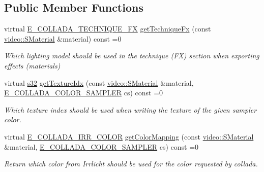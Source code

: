 \subsection*{Public Member Functions}
\begin{DoxyCompactItemize}
\item 
\mbox{\label{classirr_1_1scene_1_1IColladaMeshWriterProperties_abc0fb19092b53bdf48be8cc97a2af63b}} 
virtual \hyperlink{namespaceirr_1_1scene_a9ec31e84e05295892488296b0741e2b1}{E\+\_\+\+C\+O\+L\+L\+A\+D\+A\+\_\+\+T\+E\+C\+H\+N\+I\+Q\+U\+E\+\_\+\+FX} \hyperlink{classirr_1_1scene_1_1IColladaMeshWriterProperties_abc0fb19092b53bdf48be8cc97a2af63b}{get\+Technique\+Fx} (const \hyperlink{classirr_1_1video_1_1SMaterial}{video\+::\+S\+Material} \&material) const =0
\begin{DoxyCompactList}\small\item\em Which lighting model should be used in the technique (FX) section when exporting effects (materials) \end{DoxyCompactList}\item 
virtual \hyperlink{namespaceirr_ac66849b7a6ed16e30ebede579f9b47c6}{s32} \hyperlink{classirr_1_1scene_1_1IColladaMeshWriterProperties_a171287213537036be889a36ae4896c0e}{get\+Texture\+Idx} (const \hyperlink{classirr_1_1video_1_1SMaterial}{video\+::\+S\+Material} \&material, \hyperlink{namespaceirr_1_1scene_a6204218341c6b449d879cd8367b2f8d8}{E\+\_\+\+C\+O\+L\+L\+A\+D\+A\+\_\+\+C\+O\+L\+O\+R\+\_\+\+S\+A\+M\+P\+L\+ER} cs) const =0
\begin{DoxyCompactList}\small\item\em Which texture index should be used when writing the texture of the given sampler color. \end{DoxyCompactList}\item 
virtual \hyperlink{namespaceirr_1_1scene_a61cba210038d6d843b81d9282f1cac7e}{E\+\_\+\+C\+O\+L\+L\+A\+D\+A\+\_\+\+I\+R\+R\+\_\+\+C\+O\+L\+OR} \hyperlink{classirr_1_1scene_1_1IColladaMeshWriterProperties_ab347c50cc9b291625d051a919d8772ab}{get\+Color\+Mapping} (const \hyperlink{classirr_1_1video_1_1SMaterial}{video\+::\+S\+Material} \&material, \hyperlink{namespaceirr_1_1scene_a6204218341c6b449d879cd8367b2f8d8}{E\+\_\+\+C\+O\+L\+L\+A\+D\+A\+\_\+\+C\+O\+L\+O\+R\+\_\+\+S\+A\+M\+P\+L\+ER} cs) const =0
\begin{DoxyCompactList}\small\item\em Return which color from Irrlicht should be used for the color requested by collada. \end{DoxyCompactList}\item 

\end{DoxyCompactItemize}
